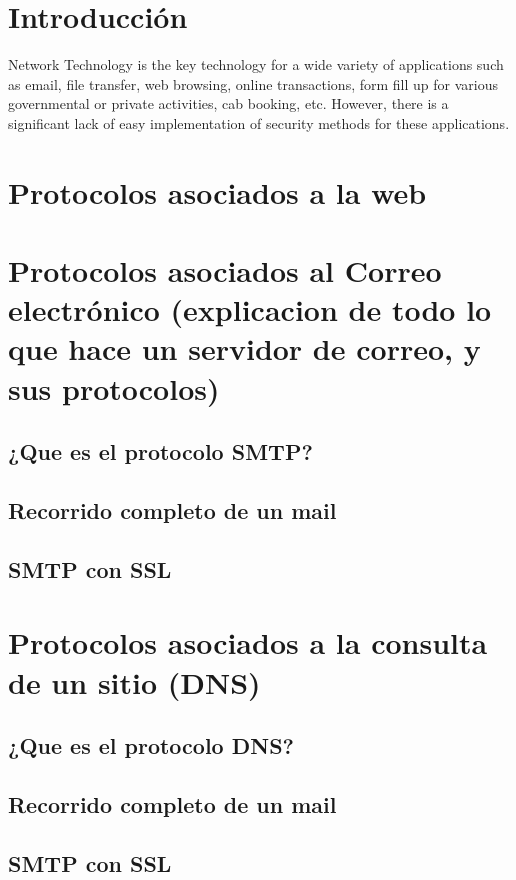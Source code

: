 
\section{Introducción}
Network Technology is the key technology for a wide variety of applications such as
email, file transfer, web browsing, online transactions, form fill up for various governmental or private activities, cab booking, etc. However, there is a significant lack of
easy implementation of security methods for these applications. 
\section{Protocolos asociados a la web}
    


\section{Protocolos asociados al Correo electrónico (explicacion de todo lo que hace un servidor de correo, y sus protocolos)}
    \subsection{¿Que es el protocolo SMTP?}
    \subsection{Recorrido completo de un mail}
    \subsection{SMTP con SSL}

\section{Protocolos asociados a la consulta de un sitio (DNS)}
    \subsection{¿Que es el protocolo DNS?} 
    \subsection{Recorrido completo de un mail}
    \subsection{SMTP con SSL}




